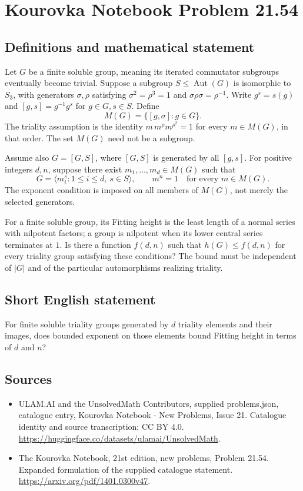 \documentclass[11pt,a4paper]{article}
\begin{document}
\section*{Kourovka Notebook Problem 21.54}\label{statement}

\subsection{Definitions and mathematical statement}
Let $G$ be a finite soluble group, meaning its iterated commutator
subgroups eventually become trivial. Suppose a subgroup
$S\le\operatorname{Aut}(G)$ is isomorphic to $S_3$, with generators
$\sigma,\rho$ satisfying $\sigma^2=\rho^3=1$ and
$\sigma\rho\sigma=\rho^{-1}$. Write $g^s=s(g)$ and
$[g,s]=g^{-1}g^s$ for $g\in G,s\in S$.
Define
\[
 M(G)=\{[g,\sigma]:g\in G\}.
\]
The triality assumption is the identity
$m\,m^\rho m^{\rho^2}=1$ for every $m\in M(G)$, in that order.
The set $M(G)$ need not be a subgroup.

Assume also $G=[G,S]$, where $[G,S]$ is generated by all $[g,s]$.
For positive integers $d,n$, suppose there exist
$m_1,\ldots,m_d\in M(G)$ such that
\[
 G=\langle m_i^s:1\le i\le d,\ s\in S\rangle,
 \qquad m^n=1\quad\text{for every }m\in M(G).
\]
The exponent condition is imposed on all members of $M(G)$, not merely
the selected generators.

For a finite soluble group, its Fitting height is the least length
of a normal series with nilpotent factors; a group is nilpotent when
its lower central series terminates at $1$.
Is there a function $f(d,n)$ such that $h(G)\le f(d,n)$ for every
triality group satisfying these conditions? The bound must be independent
of $|G|$ and of the particular automorphisms realizing triality.
\subsection{Short English statement}
For finite soluble triality groups generated by $d$ triality elements and their images, does bounded exponent on those elements bound Fitting height in terms of $d$ and $n$?
\subsection{Sources}
\begin{itemize}
\item[S1] ULAM.AI and the UnsolvedMath Contributors, supplied problems.json, catalogue entry, Kourovka Notebook - New Problems, Issue 21. Catalogue identity and source transcription; CC BY 4.0.
\url{https://huggingface.co/datasets/ulamai/UnsolvedMath}.
\item[S2] The Kourovka Notebook, 21st edition, new problems, Problem 21.54. Expanded formulation of the supplied catalogue statement.
\url{https://arxiv.org/pdf/1401.0300v47}.
\end{itemize}
\end{document}

